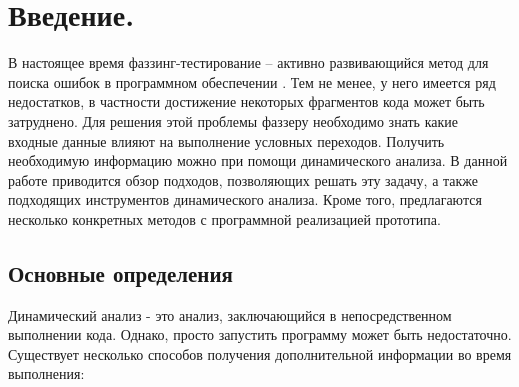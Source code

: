 \section{Введение.}

В настоящее время фаззинг-тестирование -- активно развивающийся метод для поиска ошибок в программном обеспечении \cite{DBLP:journals/corr/abs-1808-09700}. Тем не менее, у него имеется ряд недостатков, в частности достижение некоторых фрагментов кода может быть затруднено. Для решения этой проблемы фаззеру необходимо знать какие входные данные влияют на выполнение условных переходов. Получить необходимую информацию можно при помощи динамического анализа. В данной работе приводится обзор подходов, позволяющих решать эту задачу, а также подходящих инструментов динамического анализа. Кроме того, предлагаются несколько конкретных методов с программной реализацией прототипа.




\subsection{Основные определения}

Динамический анализ - это анализ, заключающийся в непосредственном выполнении кода. Однако, просто запустить программу может быть недостаточно. Существует несколько способов получения дополнительной информации во время выполнения:

